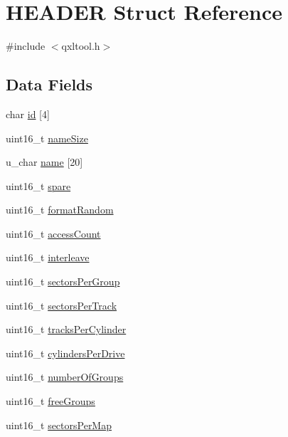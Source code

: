 \hypertarget{struct_h_e_a_d_e_r}{}\section{H\+E\+A\+D\+ER Struct Reference}
\label{struct_h_e_a_d_e_r}


{\ttfamily \#include $<$qxltool.\+h$>$}

\subsection*{Data Fields}
\begin{DoxyCompactItemize}
\item 
char \hyperlink{struct_h_e_a_d_e_r_ace593da5319500315498c8f845ee2368}{id} \mbox{[}4\mbox{]}
\item 
uint16\+\_\+t \hyperlink{struct_h_e_a_d_e_r_a0b15bb8f9aee33d3e49dcd95093bf88a}{name\+Size}
\item 
u\+\_\+char \hyperlink{struct_h_e_a_d_e_r_a09712874ff8b1883dffe908ad2337d05}{name} \mbox{[}20\mbox{]}
\item 
uint16\+\_\+t \hyperlink{struct_h_e_a_d_e_r_ae186db2aeadfd250f02cd5a4cce4054f}{spare}
\item 
uint16\+\_\+t \hyperlink{struct_h_e_a_d_e_r_acd79f29d21866fa067b0feca592a8b65}{format\+Random}
\item 
uint16\+\_\+t \hyperlink{struct_h_e_a_d_e_r_afc2d7713c108e80878e5e57fa3b8f082}{access\+Count}
\item 
uint16\+\_\+t \hyperlink{struct_h_e_a_d_e_r_abd3763b764e7f73b3ce499116279e377}{interleave}
\item 
uint16\+\_\+t \hyperlink{struct_h_e_a_d_e_r_aec959e3993607a7c8a039a03639cac44}{sectors\+Per\+Group}
\item 
uint16\+\_\+t \hyperlink{struct_h_e_a_d_e_r_a42886f9109ee1759d5972e871f0689a8}{sectors\+Per\+Track}
\item 
uint16\+\_\+t \hyperlink{struct_h_e_a_d_e_r_a583b97c33089d32720d81b800855ef34}{tracks\+Per\+Cylinder}
\item 
uint16\+\_\+t \hyperlink{struct_h_e_a_d_e_r_acb15363433a666b3697fadb3d1bbfb6d}{cylinders\+Per\+Drive}
\item 
uint16\+\_\+t \hyperlink{struct_h_e_a_d_e_r_a0d376f9b00a3d00a747929a325a5ca35}{number\+Of\+Groups}
\item 
uint16\+\_\+t \hyperlink{struct_h_e_a_d_e_r_ade875077d30252b3c29f1798215714b7}{free\+Groups}
\item 
uint16\+\_\+t \hyperlink{struct_h_e_a_d_e_r_a64a257d7a41c66c743cf02ce75a7ed69}{sectors\+Per\+Map}

\end{DoxyCompactItemize}
